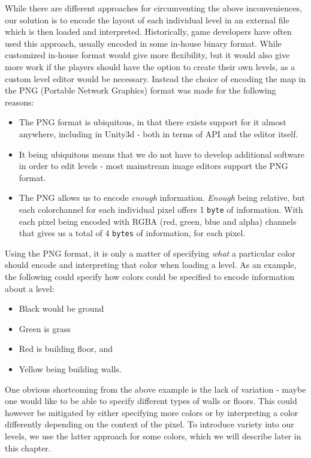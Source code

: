 While there are different approaches for circumventing the above inconveniences, our solution is to encode the layout of each individual level in an external file which is then loaded and interpreted. 
Historically, game developers have often used this approach, usually encoded in some in-house binary format. 
While customized in-house format would give more flexibility, but it would also give more work if the players should have the option to create their own levels, as a custom level editor would be necessary.
Instead the choice of encoding the map in the PNG (Portable Network Graphics) format was made for the following reasons:
\begin{itemize}
    \item The PNG format is ubiquitous, in that there exists support for it almost anywhere, including in Unity3d - both in terms of API and the editor itself.
    \item It being ubiquitous means that we do not have to develop additional software in order to edit levels - most mainstream image editors support the PNG format.
    \item The PNG allows us to encode \textit{enough} information. 
    	\textit{Enough} being relative, but each colorchannel for each individual pixel offers 1 \texttt{byte} of information. 
    	With each pixel being encoded with RGBA (red, green, blue and alpha) channels that gives us a total of 4 \texttt{bytes} of information, for each pixel.
\end{itemize}
Using the PNG format, it is only a matter of specifying \textit{what} a particular color should encode and interpreting that color when loading a level. 
As an example, the following could specify how colors could be specified to encode information about a level:
\begin{itemize}
    \item Black would be ground
    \item Green is grass
    \item Red is building floor, and
    \item Yellow being building walls.
\end{itemize}
One obvious shortcoming from the above example is the lack of variation - maybe one would like to be able to specify different types of walls or floors. This could however be mitigated by either specifying more colors or by interpreting a color differently depending on the context of the pixel.
To introduce variety into our levels, we use the latter approach for some colors, which we will describe later in this chapter.
\\


